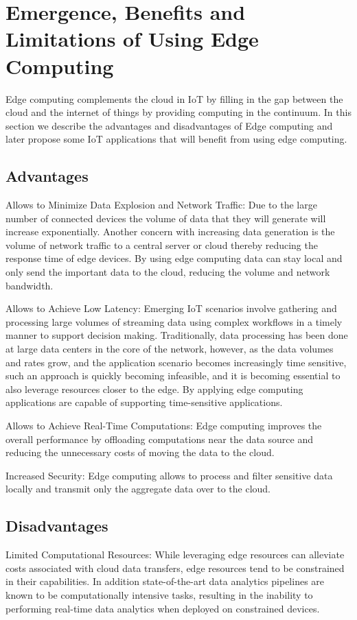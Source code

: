 \section{Emergence, Benefits and Limitations of Using Edge Computing}
Edge computing complements the cloud in IoT by filling in the gap between the cloud and the internet of things by providing computing in the continuum. In this section we describe the advantages and disadvantages of Edge computing and later propose some IoT applications that will benefit from using edge computing.

\subsection{Advantages}

Allows to Minimize Data Explosion and Network Traffic: Due to the large number of connected devices the volume of data that they will generate will increase exponentially. Another concern with increasing data generation is the volume of network traffic to a central server or cloud thereby reducing the response time of edge devices. By using edge computing data can stay local and only send the important data to the cloud, reducing the volume and network bandwidth.

Allows to Achieve Low Latency: Emerging IoT scenarios involve gathering and processing large volumes of streaming data using complex workflows in a timely manner to support decision making. Traditionally, data processing has been done at large data centers in the core of the network, however, as the data volumes and rates grow, and the application scenario becomes increasingly time sensitive, such an approach is quickly becoming infeasible, and it is becoming essential to also leverage resources closer to the edge. By applying edge computing applications are capable of supporting time-sensitive applications.

Allows to Achieve Real-Time Computations: Edge computing improves the overall performance by offloading computations near the data source and reducing the unnecessary costs of moving the data to the cloud.

Increased Security: Edge computing allows to process and filter sensitive data locally and transmit only the aggregate data over to the cloud.

\subsection{Disadvantages}
Limited Computational Resources: While leveraging edge resources can alleviate costs associated with cloud data transfers, edge resources tend to be constrained in their capabilities. In addition state-of-the-art data analytics pipelines are known to be computationally intensive tasks, resulting in the inability to performing real-time data analytics when deployed on constrained devices.


